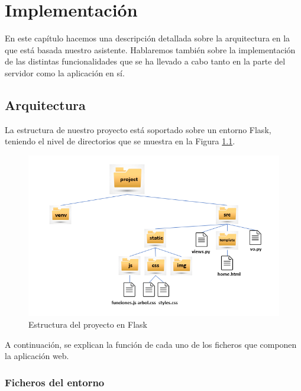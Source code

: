 \chapter{Implementación}
\label{cap:implementacion}



En este capítulo hacemos una descripción detallada sobre la arquitectura en la que está basada nuestro asistente. Hablaremos también sobre la implementación de las distintas funcionalidades que se ha llevado a cabo tanto en la parte del servidor como la aplicación en sí.


\section{Arquitectura}

La estructura de nuestro proyecto está soportado sobre un entorno Flask, teniendo el nivel de directorios que se muestra en la Figura \ref{fig:projectStructure}.

	 \begin{figure}[h!]
	\centering
	
	
	\includegraphics[scale=1.2]{Imagenes/Figuras/Project-Structure}
	
	
	\caption{Estructura del proyecto en Flask}
	\label{fig:projectStructure}
\end{figure}

A continuación, se explican la función de cada uno de los ficheros que componen la aplicación web.

\subsection{Ficheros del entorno}

